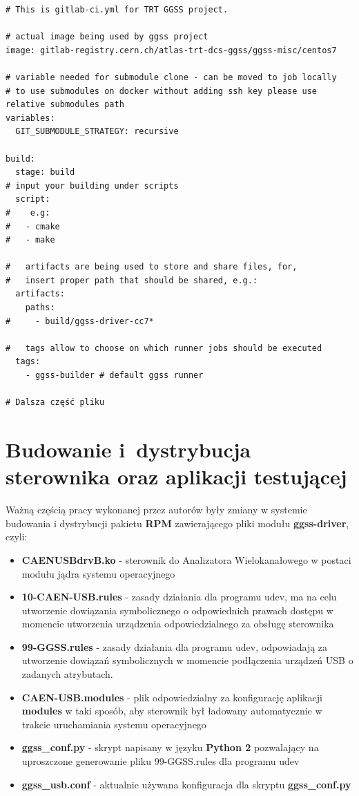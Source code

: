 \begin{lstlisting}[caption={Fragment szablonu ułatwiającego pisanie plików \textit{.gitlab-ci.yml} znajdującego się w~repozytorium \textit{aux}}, label={lst:ggsscicdtempl}]
# This is gitlab-ci.yml for TRT GGSS project.

# actual image being used by ggss project
image: gitlab-registry.cern.ch/atlas-trt-dcs-ggss/ggss-misc/centos7

# variable needed for submodule clone - can be moved to job locally
# to use submodules on docker without adding ssh key please use relative submodules path
variables:
  GIT_SUBMODULE_STRATEGY: recursive

build:
  stage: build
# input your building under scripts
  script:
#    e.g:
#   - cmake
#   - make

#   artifacts are being used to store and share files, for,
#   insert proper path that should be shared, e.g.:
  artifacts:
    paths:
#     - build/ggss-driver-cc7*

#   tags allow to choose on which runner jobs should be executed
  tags:
    - ggss-builder # default ggss runner

# Dalsza część pliku

\end{lstlisting}


\newpage
\section{Budowanie i~dystrybucja sterownika oraz aplikacji testującej}
\label{section:driver}

Ważną częścią pracy wykonanej przez autorów były zmiany w systemie budowania i dystrybucji pakietu \textbf{RPM} zawierającego pliki modułu \textbf{ggss-driver}, czyli:
\begin{itemize}
\item \textbf{CAENUSBdrvB.ko} - sterownik do Analizatora Wielokanałowego w postaci modułu jądra systemu operacyjnego
\item \textbf{10-CAEN-USB.rules} - zasady działania dla programu udev, ma na celu utworzenie dowiązania symbolicznego o odpowiednich prawach dostępu w momencie utworzenia urządzenia odpowiedzialnego za obsługę sterownika
\item \textbf{99-GGSS.rules} - zasady działania dla programu udev, odpowiadają za utworzenie dowiązań symbolicznych w momencie podłączenia urządzeń USB o zadanych atrybutach.
\item \textbf{CAEN-USB.modules} - plik odpowiedzialny za konfigurację aplikacji \textbf{modules} w taki sposób, aby sterownik był ładowany automatycznie w trakcie uruchamiania systemu operacyjnego
\item \textbf{ggss\_conf.py} - skrypt napisany w języku \textbf{Python 2} pozwalający na uproszczone generowanie pliku 99-GGSS.rules dla programu udev
\item \textbf{ggss\_usb.conf} - aktualnie używana konfiguracja dla skryptu \textbf{ggss\_conf.py}
\end{itemize}

